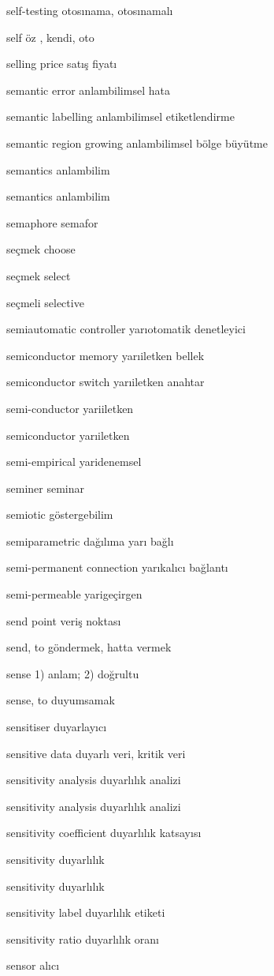 \documentclass[12pt,fleqn]{article}\usepackage{../../common}
\begin{document}
self-testing otosınama, otosınamalı

self öz , kendi, oto

selling price satış fiyatı

semantic error anlambilimsel hata

semantic labelling anlambilimsel etiketlendirme

semantic region growing anlambilimsel bölge büyütme

semantics anlambilim

semantics anlambilim

semaphore semafor

seçmek choose

seçmek select

seçmeli selective

semiautomatic controller yarıotomatik denetleyici

semiconductor memory yarıiletken bellek

semiconductor switch yarıiletken anahtar

semi-conductor yariiletken

semiconductor yarıiletken

semi-empirical yaridenemsel

seminer seminar

semiotic göstergebilim

semiparametric dağılıma yarı bağlı

semi-permanent connection yarıkalıcı bağlantı

semi-permeable yarigeçirgen

send point veriş noktası

send, to göndermek, hatta vermek

sense 1) anlam; 2) doğrultu

sense, to duyumsamak

sensitiser duyarlayıcı

sensitive data duyarlı veri, kritik veri

sensitivity analysis duyarlılık analizi

sensitivity analysis duyarlılık analizi

sensitivity coefficient duyarlılık katsayısı

sensitivity duyarlılık

sensitivity duyarlılık

sensitivity label duyarlılık etiketi

sensitivity ratio duyarlılık oranı

sensor alıcı
\end{document}
